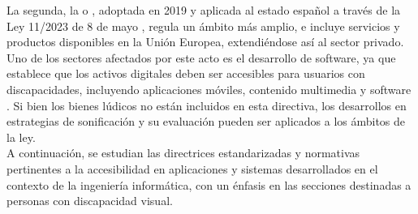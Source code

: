  La segunda, la  o  \cite{DirectiveEU20192019}, adoptada en 2019 y aplicada al estado español a través de la Ley 11/2023 de 8 de mayo \cite{jefaturadelestadoLey1120232023}, regula un ámbito más amplio, e incluye servicios y productos disponibles en la Unión Europea, extendiéndose así al sector privado. Uno de los sectores afectados por este acto es el desarrollo de software, ya que establece que los activos digitales deben ser accesibles para usuarios con discapacidades, incluyendo aplicaciones móviles, contenido multimedia y software \cite[p ~83]{DirectiveEU20192019}. Si bien los bienes lúdicos no están incluidos en esta directiva, los desarrollos en estrategias de sonificación y su evaluación pueden ser aplicados a los ámbitos de la ley.\\

 A continuación, se estudian las directrices estandarizadas y normativas pertinentes a la accesibilidad en aplicaciones y sistemas desarrollados en el contexto de la ingeniería informática, con un énfasis en las secciones destinadas a personas con discapacidad visual.
 
